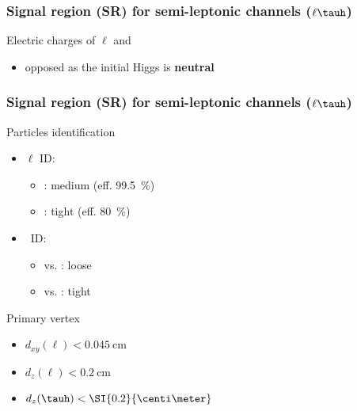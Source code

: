 \begin{frame}
\frametitle{Signal region (SR) for semi-leptonic channels ($\ell\tauh$)}

\begin{block}{Electric charges of $\ell$ and \tauh}
\begin{itemize}
\item opposed as the initial Higgs is \textbf{neutral}
\end{itemize}
\begin{center}

\end{center}
\end{block}

\end{frame}
\begin{frame}
\frametitle{Signal region (SR) for semi-leptonic channels ($\ell\tauh$)}

\begin{block}{Particles identification}
\begin{multicols}{2}
\begin{itemize}
\item $\ell$ ID:
\begin{itemize}
\item \mu: medium (eff. \SI{99.5}{\%})
\item \ele: tight (eff. \SI{80}{\%})
\end{itemize}
\item \tauh\ ID:
\begin{itemize}
\item vs. \mu: loose
\item vs. \ele: tight
\end{itemize}
\end{itemize}
\end{multicols}
\end{block}

\pause
\begin{block}{Primary vertex}
\begin{minipage}{.3\linewidth}
\begin{itemize}
\item $d_{xy}(\ell) < \SI{0.045}{\centi\meter}$
\item $d_{z}(\ell) < \SI{0.2}{\centi\meter}$
\item $d_{z}(\tauh) < \SI{0.2}{\centi\meter}$
\end{itemize}
\end{minipage}
\begin{minipage}{.65\linewidth}
\begin{center}
\begin{tikzpicture}[scale=1]


\end{tikzpicture}
\end{center}
\end{minipage}
\end{block}
\end{frame}
